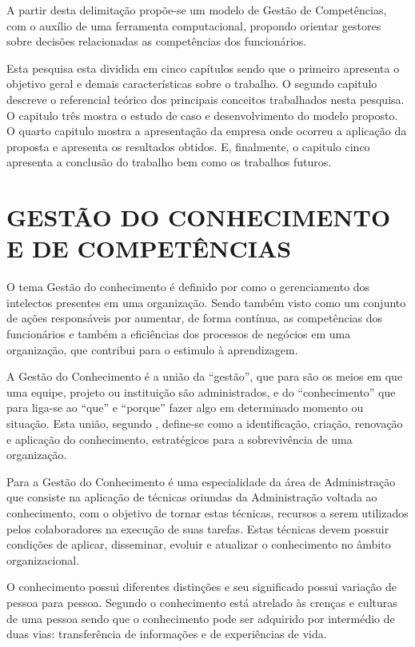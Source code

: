 A partir desta delimitação propõe-se um modelo de Gestão de Competências, com o auxílio de uma ferramenta computacional, propondo orientar gestores sobre decisões relacionadas as competências dos funcionários.

Esta pesquisa esta dividida em cinco capítulos sendo que o primeiro apresenta o objetivo geral e demais características sobre o trabalho. O segundo capitulo descreve o referencial teórico dos principais conceitos trabalhados nesta pesquisa. O capitulo três mostra o estudo de caso e desenvolvimento do modelo proposto. O quarto capitulo mostra a apresentação da empresa onde ocorreu a aplicação da proposta e apresenta os resultados obtidos. E, finalmente, o capitulo cinco apresenta a conclusão do trabalho bem como os trabalhos futuros.

\chapter{GESTÃO DO CONHECIMENTO E DE COMPETÊNCIAS}

O tema Gestão do conhecimento é definido por  como o gerenciamento dos intelectos presentes em uma organização. Sendo também visto como um conjunto de ações responsáveis por aumentar, de forma contínua, as competências dos funcionários e também a eficiências dos processos de negócios em uma organização, que contribui para o estimulo à aprendizagem.

A Gestão do Conhecimento é a união da “gestão”, que para  são os meios em que uma equipe, projeto ou instituição são administrados, e do “conhecimento” que para  liga-se ao “que” e “porque” fazer algo em determinado momento ou situação. Esta união, segundo , define-se como a identificação, criação, renovação e aplicação do conhecimento, estratégicos para a sobrevivência de uma organização.

Para  a Gestão do Conhecimento é uma especialidade da área de Administração que consiste na aplicação de técnicas oriundas da Administração voltada ao conhecimento, com o objetivo de tornar estas técnicas, recursos a serem utilizados pelos colaboradores na execução de suas tarefas. Estas técnicas devem possuir condições de aplicar, disseminar, evoluir e atualizar o conhecimento no âmbito organizacional.

O conhecimento possui diferentes distinções e seu significado possui variação de pessoa para pessoa. Segundo  o conhecimento está atrelado às crenças e culturas de uma pessoa sendo que o conhecimento pode ser adquirido por intermédio de duas vias: transferência de informações e de experiências de vida.

